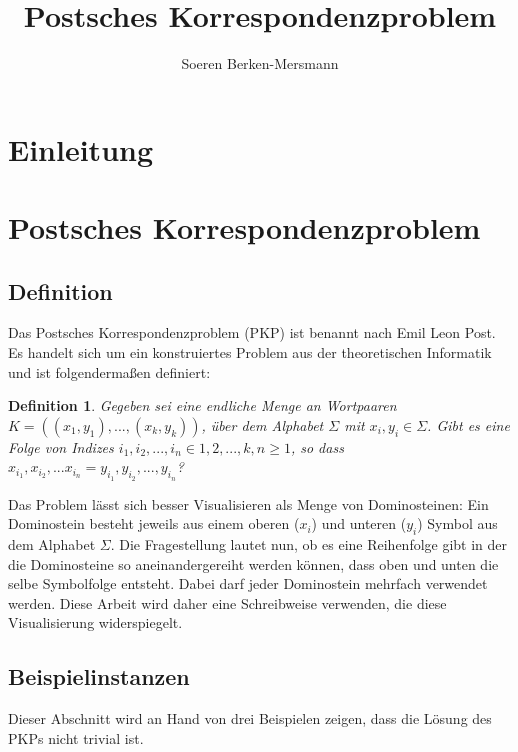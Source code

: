 \documentclass[]{scrartcl}
\title{Postsches Korrespondenzproblem}
\author{Soeren Berken-Mersmann}
\newtheorem{definition}{Definition}[section]
\begin{document}
\maketitle

\begin{abstract}

\end{abstract}

\section{Einleitung}

\section{Postsches Korrespondenzproblem}

	\subsection{Definition}
	
		Das Postsches Korrespondenzproblem (PKP) ist benannt nach Emil Leon Post. Es handelt sich um ein konstruiertes Problem aus der theoretischen Informatik und ist folgendermaßen definiert:
		
		\begin{definition}
			Gegeben sei eine endliche Menge an Wortpaaren $K = ((x_1, y_1), ..., (x_k, y_k))$, über dem Alphabet $\Sigma$ mit $x_i, y_i \in \Sigma$. Gibt es eine Folge von Indizes $i_1, i_2, ..., i_n \in {1, 2, ..., k}, n \geq 1$, so dass $x_{i_1},x_{i_2}, ... x_{i_n} = y_{i_1}, y_{i_2}, ..., y_{i_n}$?
		\end{definition}
		
		Das Problem lässt sich besser Visualisieren als Menge von Dominosteinen: Ein Dominostein besteht jeweils aus einem oberen ($x_i$) und unteren ($y_i$) Symbol aus dem Alphabet $\Sigma$. Die Fragestellung lautet nun, ob es eine Reihenfolge gibt in der die Dominosteine so aneinandergereiht werden können, dass oben und unten die selbe Symbolfolge entsteht. Dabei darf jeder Dominostein mehrfach verwendet werden. Diese Arbeit wird daher eine Schreibweise verwenden, die diese Visualisierung widerspiegelt.
	
	\subsection{Beispielinstanzen}
		
		Dieser Abschnitt wird an Hand von drei Beispielen zeigen, dass die Lösung des PKPs nicht trivial ist.
\end{document}
